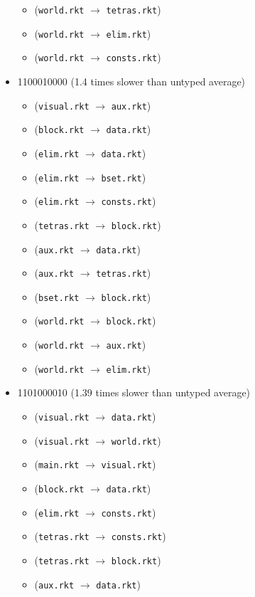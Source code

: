 \documentclass{article}
\newcommand{\mono}[1]{\texttt{#1}}
\begin{document}
\begin{itemize}
\begin{itemize}
  \item (\mono{world.rkt} $\rightarrow$ \mono{tetras.rkt})
  \item (\mono{world.rkt} $\rightarrow$ \mono{elim.rkt})
  \item (\mono{world.rkt} $\rightarrow$ \mono{consts.rkt})
  \end{itemize}
\item 1100010000 (1.4 times slower than untyped average)
  \begin{itemize}
  \item (\mono{visual.rkt} $\rightarrow$ \mono{aux.rkt})
  \item (\mono{block.rkt} $\rightarrow$ \mono{data.rkt})
  \item (\mono{elim.rkt} $\rightarrow$ \mono{data.rkt})
  \item (\mono{elim.rkt} $\rightarrow$ \mono{bset.rkt})
  \item (\mono{elim.rkt} $\rightarrow$ \mono{consts.rkt})
  \item (\mono{tetras.rkt} $\rightarrow$ \mono{block.rkt})
  \item (\mono{aux.rkt} $\rightarrow$ \mono{data.rkt})
  \item (\mono{aux.rkt} $\rightarrow$ \mono{tetras.rkt})
  \item (\mono{bset.rkt} $\rightarrow$ \mono{block.rkt})
  \item (\mono{world.rkt} $\rightarrow$ \mono{block.rkt})
  \item (\mono{world.rkt} $\rightarrow$ \mono{aux.rkt})
  \item (\mono{world.rkt} $\rightarrow$ \mono{elim.rkt})
  \end{itemize}
\item 1101000010 (1.39 times slower than untyped average)
  \begin{itemize}
  \item (\mono{visual.rkt} $\rightarrow$ \mono{data.rkt})
  \item (\mono{visual.rkt} $\rightarrow$ \mono{world.rkt})
  \item (\mono{main.rkt} $\rightarrow$ \mono{visual.rkt})
  \item (\mono{block.rkt} $\rightarrow$ \mono{data.rkt})
  \item (\mono{elim.rkt} $\rightarrow$ \mono{consts.rkt})
  \item (\mono{tetras.rkt} $\rightarrow$ \mono{consts.rkt})
  \item (\mono{tetras.rkt} $\rightarrow$ \mono{block.rkt})
  \item (\mono{aux.rkt} $\rightarrow$ \mono{data.rkt})

\end{itemize}
\end{itemize}
\end{document}
